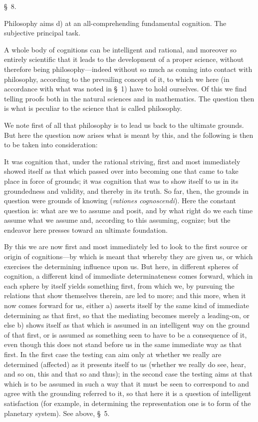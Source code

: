 \documentclass[12pt,a4paper]{book}
\begin{document}
\begin{center}\large\S~8.\end{center}
\begin{center}Philosophy aims d) at an all-comprehending fundamental cognition.
The subjective principal task.\end{center}

A whole body of cognitions can be intelligent and rational, and moreover so
entirely scientific that it leads to the development of a proper science, without
therefore being philosophy---indeed without so much as coming into contact with
philosophy, according to the prevailing concept of it, to which we here (in
accordance with what was noted in \S~1) have to hold ourselves. Of this we find
telling proofs both in the natural sciences and in mathematics. The question then
is what is peculiar to the science that is called philosophy.

We note first of all that philosophy is to lead us back to the ultimate grounds.
But here the question now arises what is meant by this, and the following is then
to be taken into consideration:

It was cognition that, under the rational striving, first and most immediately
showed itself as that which passed over into becoming one that came to take place
in force of grounds; it was cognition that was to show itself to us in its
groundedness and validity, and thereby in its truth. So far, then, the grounds in
question were grounds of knowing (\textit{rationes cognoscendi}). Here the
constant question is: what are we to assume and posit, and by what right do we
each time assume what we assume and, according to this assuming, cognize; but the
endeavor here presses toward an ultimate foundation.

By this we are now first and most immediately led to look to the first source or
origin of cognitions---by which is meant that whereby they are given us, or which
exercises the determining influence upon us. But here, in different spheres of
cognition, a different kind of immediate determinateness comes forward, which in
each sphere by itself yields something first, from which we, by pursuing the
relations that show themselves therein, are led to more; and this more, when it
now comes forward for us, either a) asserts itself by the same kind of immediate
determining as that first, so that the mediating becomes merely a leading-on, or
else b) shows itself as that which is assumed in an intelligent way on the ground
of that first, or is assumed as something seen to have to be a consequence of it,
even though this does not stand before us in the same immediate way as that first.
In the first case the testing can aim only at whether we really are determined
(affected) as it presents itself to us (whether we really do see, hear, and so on,
this and that so and thus); in the second case the testing aims at that which is
to be assumed in such a way that it must be seen to correspond to and agree with
the grounding referred to it, so that here it is a question of intelligent
satisfaction (for example, in determining the representation one is to form of the
planetary system). See above, \S~5.
\end{document}
